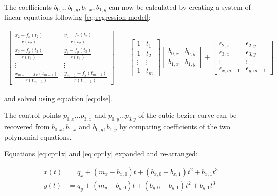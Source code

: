 The coefficients $b_{0,x}, b_{0,y}, b_{1,x}, b_{1,y}$ can now be calculated by creating a system of linear equations following \ref{eq:regression-model}:

\begin{align}
    \begin{bmatrix}
        \frac{x_2 - f_x(t_2)}{r(t_2)} & \frac{y_2 - f_x(t_2)}{r(t_2)} \\
        \frac{x_3 - f_y(t_3)}{r(t_3)} & \frac{y_3 - f_y(t_3)}{r(t_3)} \\
        \vdots & \vdots \\
        \frac{x_{m-1} - f_x(t_{m-1})}{r(t_{m-1})} & \frac{y_{m-1} - f_y(t_{m-1})}{r(t_{m-1})}
    \end{bmatrix}
    &=
    \begin{bmatrix}
        1      & t_1     \\
        1      & t_2     \\
        \vdots & \vdots  \\
        1      & t_m
    \end{bmatrix}
    \begin{bmatrix}
        b_{0,x} & b_{0,y} \\
        b_{1,x} & b_{1,y}
    \end{bmatrix}
    +
    \begin{bmatrix}
        \epsilon_{2,x} & \epsilon_{2,y} \\
        \epsilon_{3,x} & \epsilon_{3,y} \\
        \vdots         & \vdots \\
        \epsilon_{x,{m-1}} & \epsilon_{y,{m-1}}
    \end{bmatrix}
\end{align}

and solved using equation \ref{eq:olse}.

The control points $p_{0,x} \ldots p_{3,x}$ and $p_{0,y} \ldots p_{3,y}$ of the cubic bezier curve can be recovered from $b_{0,x},b_{1,x}$ and $b_{0,y},b_{1,y}$ by comparing coefficients of the two polynomial equations.

Equations \ref{eq:cpr1x} and \ref{eq:cpr1y} expanded and re-arranged:

\begin{align}
    x(t) &= q_x + (m_x - b_{x,0}) t + (b_{x,0} - b_{x,1}) t^2 + b_{x,1} t^3 \\
    y(t) &= q_y + (m_y - b_{y,0}) t + (b_{y,0} - b_{y,1}) t^2 + b_{y,1} t^3
\end{align}

